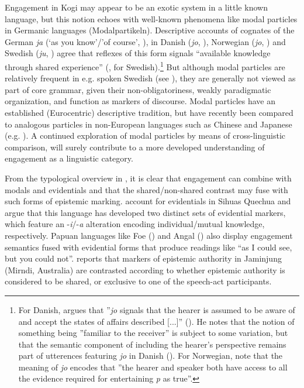 \documentclass[output=paper]{langsci/langscibook}
\begin{document}
Engagement in Kogi may appear to be an exotic system in a little known language, but this notion echoes with well-known phenomena like modal particles in Germanic languages (Modalpartikeln). Descriptive accounts of cognates of the German \textit{ja} (‘as you know’/’of course’, \citealt{Abraham1991}), in Danish (\textit{jo}, \citealt{Davidsen1996}), Norwegian (\textit{jo}, \citealt{Andvik1992}) and Swedish (\textit{ju}, \citealt{Lindstrom2008}) agree that reflexes of this form signals “available knowledge through shared experience” (\citealt[74]{Lindstrom2008}, for Swedish).\footnote{For Danish, \citeauthor{Davidsen1996} argues that ”\textit{jo} signals that the hearer is assumed to be aware of and accept the states of affairs described [...]” (\citealt[285]{Davidsen1996}). He notes that the notion of something being ”familiar to the receiver” is subject to some variation, but that the semantic component of including the hearer’s perspective remains part of utterences featuring \textit{jo} in Danish (\citealt[293]{Davidsen1996}). For Norwegian, \cite{Berthelinetal} note that the meaning of \textit{jo} encodes that ”the hearer and speaker both have access to all the evidence required for entertaining \textit{p} as true”.}
But although modal particles are relatively frequent in e.g. spoken Swedish (see \citealt{Bergqvist2017}), they are generally not viewed as part of core grammar, given their non-obligatoriness, weakly paradigmatic organization, and function as markers of discourse. Modal particles have an established (Eurocentric) descriptive tradition, but have recently been compared to analogous particles in non-European languages such as Chinese and Japanese (e.g. \citealt{AbrahamLeiss2012}). A continued exploration of modal particles by means of cross-linguistic comparison, will surely contribute to a more developed understanding of engagement as a linguistic category. 

From the typological overview in \cite{Evansetal2017b}, it is clear that engagement can combine with modals and evidentials and that the shared/non-shared contrast may fuse with such forms of epistemic marking. \cite{Hintz2017} account for evidentials in Sihuas Quechua and argue that this language has developed two distinct sets of evidential markers, which feature an -\textit{i}/-\textit{a} alteration encoding individual/mutual knowledge, respectively. Papuan languages like Foe (\citealt{Rule1977}) and Angal (\citealt{Sillitoe2010}) also display engagement semantics fused with evidential forms that produce readings like “as I could see, but you could not”. \cite{SchultzeBerndt2017} reports that markers of epistemic authority in Jaminjung (Mirndi, Australia) are contrasted according to whether epistemic authority is considered to be shared, or exclusive to one of the speech-act participants. 
\end{document}
